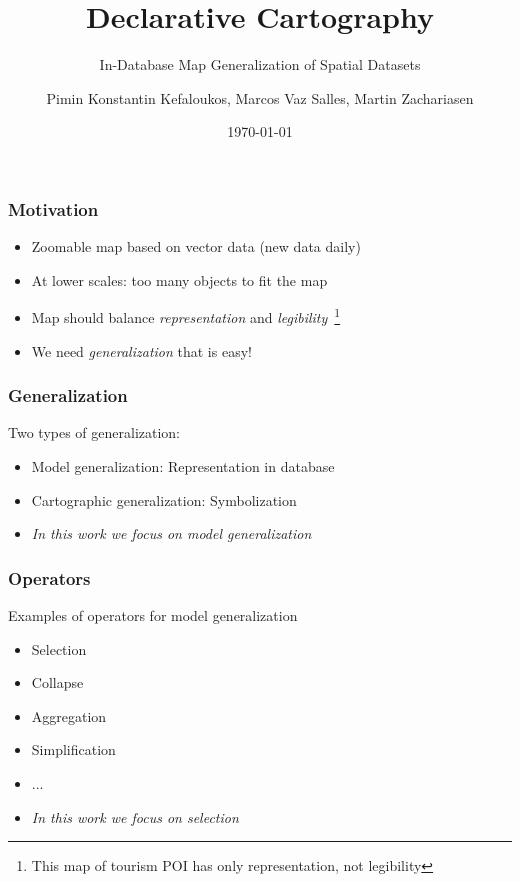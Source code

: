 \documentclass{beamer}
\title{Declarative Cartography}
\subtitle{In-Database Map Generalization of Spatial Datasets}
\author{Pimin Konstantin Kefaloukos, Marcos Vaz Salles, Martin Zachariasen}
\date{\today}
\begin{document}
\frame{\titlepage}

\frame
{
  \frametitle{Motivation}
  \begin{itemize}
  \item Zoomable map based on vector data (new data daily)
  \item At lower scales: too many objects to fit the map
  \item Map should balance \emph{representation} and  \emph{legibility}~\footnote{This map of tourism POI has only representation, not legibility}
  \item We need \emph{generalization} that is easy!
  \end{itemize}

}

\frame
{
  \frametitle{Generalization}
  Two types of generalization:
  \begin{itemize}
  \item Model generalization: Representation in database
  \item Cartographic generalization: Symbolization
  \item \emph{In this work we focus on model generalization}
  \end{itemize}
}

\frame
{
  \frametitle{Operators}
  Examples of operators for model generalization
  \begin{itemize}
  \item Selection
  \item Collapse
  \item Aggregation
  \item Simplification
  \item ...
  \item \emph{In this work we focus on selection}
  \end{itemize}
}
\end{document}
